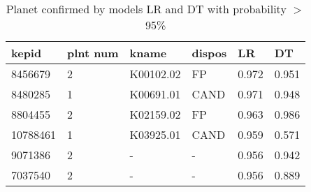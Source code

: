 \begin{table}[!htbp]
 \centering
 \caption{Planet confirmed by models LR and DT with probability $>$ 95\%}
 \label{dataLRDTcreftab} 
  \begin{tabular}
{| 
 p{}| 
 p{}| 
 p{}| 
 p{}| 
 p{}| 
 p{}| 
}\hline 
\textbf{kepid} &\textbf{plnt num} &\textbf{kname} &\textbf{dispos} &\textbf{LR} &\textbf{DT} \\ \hline 
8456679 &2 &K00102.02 &FP &0.972 &0.951 \\ \hline 
8480285 &1 &K00691.01 &CAND &0.971 &0.948 \\ \hline 
8804455 &2 &K02159.02 &FP &0.963 &0.986 \\ \hline 
10788461 &1 &K03925.01 &CAND &0.959 &0.571 \\ \hline 
9071386 &2 &- &- &0.956 &0.942 \\ \hline 
7037540 &2 &- &- &0.956 &0.889 \\ \hline 
\end{tabular} 
\end{table}